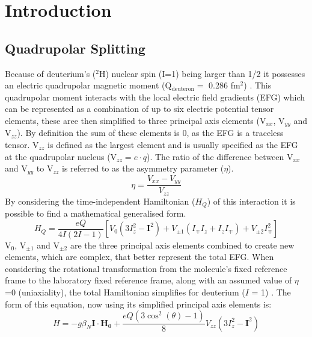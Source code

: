 \documentclass[class=article, crop=false]{standalone}
\begin{document}
 
\label{section:Quad}

\section{Introduction}

\subsection{Quadrupolar Splitting}

Because of deuterium's ($^2$H) nuclear spin (I=1) being larger than 1/2 it possesses an electric quadrupolar magnetic moment (Q$_{\text{deuteron}}=$ 0.286 fm$^2$) \cite{Stone2015NuclearData}. This quadrupolar moment interacts with the local electric field gradients (EFG) which can be represented as a combination of up to six electric potential tensor elements, these aree then simplified to three principal axis elements (V$_{xx}$, V$_{yy}$ and V$_{zz}$). By definition the sum of these elements is 0, as the EFG is a traceless tensor. V$_{zz}$ is defined as the largest element and is usually specified as the EFG at the quadrupolar nucleus (V$_{zz} = e\cdot q$)\cite{Elliott2021WhatMedia}. The ratio of the difference between V$_{xx}$ and V$_{yy}$ to V$_{zz}$ is referred to as the asymmetry parameter ($\eta$).
\begin{equation}
    \eta = \frac{V_{xx}-V_{yy}}{V_{zz}}
\end{equation}
By considering the time-independent Hamiltonian ($H_Q$) of this interaction it is possible to find a mathematical generalised form.
\begin{equation}
    H_Q = \frac{eQ}{4I(2I-1)}[V_0(3I^2_z-\boldsymbol{I}^2) + V_{\pm1}(I_{\mp}I_z+I_zI_\mp)+V_{\pm2}I^2_\mp]
\end{equation}
V$_0$, V$_{\pm1}$ and V$_{\pm2}$ are the three principal axis elements combined to create new elements, which are complex, that better represent the total EFG. When considering the rotational transformation from the molecule's fixed reference frame to the laboratory fixed reference frame\cite{Seelig1977DeuteriumMembranes}, along with an assumed value of $\eta$=0 (uniaxiality), the total Hamiltonian simplifies for deuterium ($I$ = 1) \cite{Sharf1995DetectionNMR-Spectroscopy}. The form of this equation, now using its simplified principal axis elements is:
\begin{equation}
    H = -g\beta_N\boldsymbol{I}\cdot\boldsymbol{H_0} + \frac{eQ(3\cos^2(\theta)-1)}{8}V_{zz}(3I_z^2-\boldsymbol{I}^2)
\end{equation}
\end{document}
